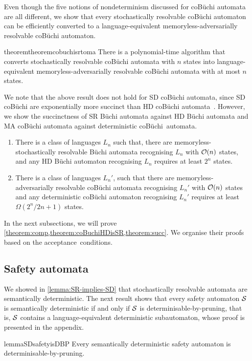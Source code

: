 %

Even though the five notions of nondeterminism discussed for coB\"uchi automata are all different, we show that every stochastically resolvable coB\"uchi automaton can be efficiently converted to a language-equivalent memoryless-adversarially resolvable coB\"uchi automaton.

\begin{restatable}{theorem}{theoremcobuchisrtoma}\label{theorem:coBuchiHDisSR}
    There is a polynomial-time algorithm that converts stochastically resolvable coB\"uchi automata with $n$ states into language-equivalent memoryless-adversarially resolvable coB\"uchi automata with at most $n$ states. 
\end{restatable}
We note that the above result does not hold for SD coB\"uchi automata, since SD coB\"uchi are exponentially more succinct than HD coB\"uchi automata~\cite[Theorem 14]{AK23}. %
However, we show the succinctness of SR B\"uchi automata against HD B\"uchi automata and MA coB\"uchi automata against deterministic coB\"uchi~automata.
\begin{theorem}\label{theorem:succ}
\begin{enumerate}
    \item  There is a class of languages $L_n$ such that, there are memoryless-stochastically resolvable B\"uchi automata recognising $L_n$ with $\mathcal{O}(n)$ states, and any HD B\"uchi automaton recognising $L_n$ requires at least $2^n$ states. 
    \item  There is a class of languages $L_n'$, such that there are memoryless-adversarially resolvable coB\"uchi automata recognising $L_n'$ with $\mathcal{O}(n)$ states and any deterministic coB\"uchi automaton recognising $L_n'$ requires at least $\Omega(2^n/2n+1)$ states. 
\end{enumerate}
\end{theorem}


In the next subsections, we will prove \cref{theorem:comp,theorem:coBuchiHDisSR,theorem:succ}. We organise their proofs based on the acceptance~conditions.
\subsection{Safety automata}\label{subsec:sac-safe}
We showed in \cref{lemma:SR-implies-SD} that stochastically resolvable automata are semantically deterministic. The next result shows that every safety automaton $\mathcal{S}$ is semantically deterministic if and only if $\mathcal{S}$ is determinisable-by-pruning, that is, $\mathcal{S}$ contains a language-equivalent deterministic subautomaton, whose proof is presented in the appendix. 
\begin{restatable}[Folklore]{lemma}{SDsafetyisDBP}\label{lemma:sd-safety-is-dbp}
    Every semantically deterministic safety automaton is determinisable-by-pruning.
\end{restatable}

